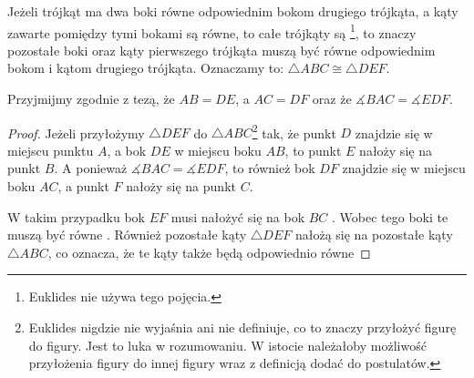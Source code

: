 \documentclass[12pt, a4paper]{scrartcl}
\begin{document}
\begin{theorem}

Jeżeli trójkąt ma dwa boki równe odpowiednim bokom drugiego trójkąta, a kąty
zawarte pomiędzy tymi bokami są równe, to całe trójkąty są
\footnote{
    Euklides nie używa tego pojęcia.
}, to znaczy pozostałe boki oraz kąty pierwszego trójkąta muszą być równe
odpowiednim bokom i kątom drugiego trójkąta. Oznaczamy to: \(\triangle ABC \cong
\triangle DEF\).

\begin{figure}[h!]
    \begin{center}
    \end{center}
\end{figure}

Przyjmijmy zgodnie z tezą, że \(AB = DE\), a \(AC = DF\) oraz że
\(\measuredangle BAC = \measuredangle EDF\).

\begin{proof}
    Jeżeli przyłożymy \(\triangle DEF\) do \(\triangle ABC\)\footnote{
        Euklides nigdzie nie wyjaśnia ani nie definiuje, co to znaczy przyłożyć
        figurę do figury. Jest to luka w rozumowaniu. W istocie należałoby
        możliwość przyłożenia figury do innej figury wraz z definicją dodać do
        postulatów.
    } tak, że punkt \(D\) znajdzie się w miejscu punktu \(A\), a bok \(DE\) w
    miejscu boku \(AB\), to punkt \(E\) nałoży się na punkt \(B\). A ponieważ
    \(\measuredangle BAC = \measuredangle EDF\), to również bok \(DF\) znajdzie
    się w miejscu boku \(AC\), a punkt \(F\) nałoży się na punkt \(C\).

    W takim przypadku bok \(EF\) musi nałożyć się na bok \(BC\) . Wobec
    tego boki te muszą być równe . Również pozostałe kąty \(\triangle
    DEF\) nałożą się na pozostałe kąty \(\triangle ABC\), co oznacza, że te kąty
    także będą odpowiednio równe 
\end{proof}
\end{theorem}
\end{document}
